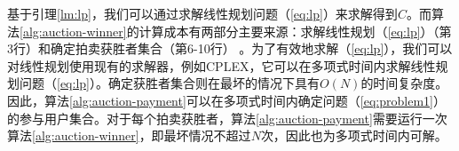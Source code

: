 	基于引理\ref{lm:lp}，我们可以通过求解线性规划问题（\ref{eq:lp}）来求解得到$C$。而算法\ref{alg:auction-winner}的计算成本有两部分主要来源：求解线性规划（\ref{eq:lp}）（第3行）和确定拍卖获胜者集合（第6-10行） 。为了有效地求解（\ref{eq:lp}），我们可以对线性规划使用现有的求解器，例如CPLEX\cite{CPLEX}，它可以在多项式时间内求解线性规划问题（\ref{eq:lp}）\cite{megiddo1986complexity}。确定获胜者集合则在最坏的情况下具有$O(N)$的时间复杂度。因此，算法\ref{alg:auction-payment}可以在多项式时间内确定问题（\ref{eq:problem1}）的参与用户集合。对于每个拍卖获胜者，算法\ref{alg:auction-payment}需要运行一次算法\ref{alg:auction-winner}，即最坏情况不超过$N$次，因此也为多项式时间内可解。
	

